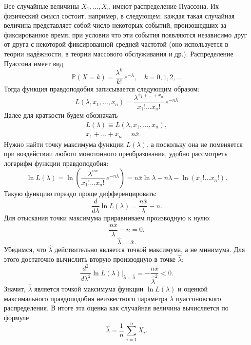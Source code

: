 \documentclass[12pt]{article}
\begin{document}
Все случайные величины $X_1, ..., X_n$ имеют распределение Пуассона. Их физический смысл состоит, например, в следующем: каждая такая случайная величина представляет собой число некоторых событий, произошедших за фиксированное время, при условии что эти события появляются независимо друг от друга с некоторой фиксированной средней частотой (оно используется в теории надёжности, в теории массового обслуживания и др.). Распределение Пуассона имеет вид
\begin{equation*}
    \mathbb{P}(X = k) = \frac{\lambda^k}{k!}\, e^{-\lambda}, \quad k = 0, 1, 2, ...
\end{equation*}
Тогда функция правдоподобия записывается следующим образом:
\begin{equation*}
    L(\lambda, x_1, ..., x_n) = \frac{\lambda^{x_1+...+x_n}}{x_1!...x_n!}\, e^{-n\lambda}
\end{equation*}
Далее для краткости будем обозначать 
\begin{gather*}
    L(\lambda) \equiv L(\lambda, x_1, ..., x_n), \\ x_1+...+x_n = n\overline{x}.
\end{gather*}
Нужно найти точку максимума функции $L(\lambda)$, а поскольку она не поменяется при воздействии любого монотонного преобразования, удобно рассмотреть логарифм функции правдоподобия:
\begin{equation*}
    \ln{L(\lambda)} = \ln{\left(\frac{\lambda^{n\overline{x}}}{x_1!...x_n!}\, e^{-n\lambda}\right)} = n\overline{x} \ln\lambda - n\lambda - \ln{(x_1!...x_n!)}.
\end{equation*}
Такую функцию гораздо проще дифференцировать:
\begin{equation*}
    \frac{d}{d\lambda} \ln{L(\lambda)} = \frac{n\overline{x}}{\lambda} - n.
\end{equation*}
Для отыскания точки максимума приравниваем производную к нулю:
\begin{equation*}
    \frac{n\overline{x}}{\lambda} - n = 0.
\end{equation*}
\begin{equation*}
    \widehat{\lambda} = \overline{x}.
\end{equation*}
Убедимся, что $\widehat{\lambda}$ действительно является точкой максимума, а не минимума. Для этого достаточно вычислить вторую производную в точке $\widehat{\lambda}:$
\begin{equation*}
    \frac{d^2}{d\lambda^2} \ln{L(\lambda)} \bigg|_{\lambda = \widehat{\lambda}} = -\frac{n\overline{x}}{\widehat{\lambda}^2} < 0.
\end{equation*}
Значит, $\widehat{\lambda}$ является точкой максимума функции $\ln{L(\lambda)}$ и оценкой максимального правдоподобия неизвестного параметра $\lambda$ пуассоновского распределения. В итоге эта оценка как случайная величина вычисляется по формуле
\begin{equation*}
    \widehat{\lambda} = \frac{1}{n}\, \sum\limits_{i=1}^{n} X_i. 
\end{equation*}
\end{document}
